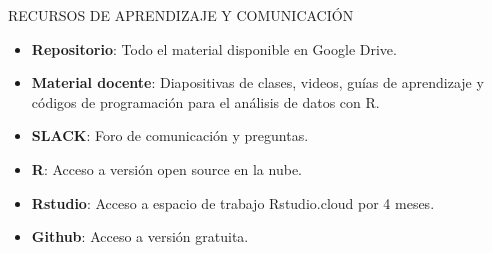 \documentclass[
  ignorenonframetext,
]{beamer}
\begin{document}
\begin{frame}{RECURSOS DE APRENDIZAJE Y COMUNICACIÓN}
\protect\hypertarget{recursos-de-aprendizaje-y-comunicaciuxf3n}{}

\begin{itemize}
\item
  \textbf{Repositorio}: Todo el material disponible en Google Drive.
\item
  \textbf{Material docente}: Diapositivas de clases, videos, guías de
  aprendizaje y códigos de programación para el análisis de datos con R.
\item
  \textbf{SLACK}: Foro de comunicación y preguntas.
\item
  \textbf{R}: Acceso a versión open source en la nube.
\item
  \textbf{Rstudio}: Acceso a espacio de trabajo Rstudio.cloud por 4
  meses.
\item
  \textbf{Github}: Acceso a versión gratuita.
\end{itemize}

\end{frame}
\end{document}

